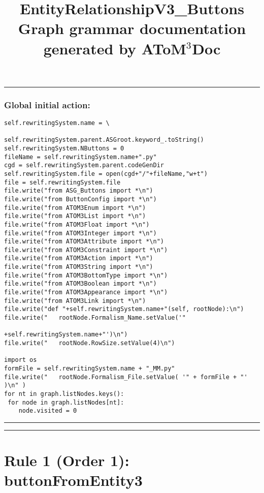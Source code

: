 \documentclass{article}
\title{ \huge{EntityRelationshipV3_Buttons} \\[4mm]
\small{ Graph grammar documentation generated by \textbf{AToM$^{3}$Doc} } }
\begin{document}
   
\maketitle         
\hrule \vspace{6pt}
\subsubsection*{Global initial action: }
\begin{small}\begin{verbatim}
self.rewritingSystem.name = \
                        self.rewritingSystem.parent.ASGroot.keyword_.toString()
self.rewritingSystem.NButtons = 0
fileName = self.rewritingSystem.name+".py"
cgd = self.rewritingSystem.parent.codeGenDir
self.rewritingSystem.file = open(cgd+"/"+fileName,"w+t")
file = self.rewritingSystem.file
file.write("from ASG_Buttons import *\n")
file.write("from ButtonConfig import *\n")
file.write("from ATOM3Enum import *\n")
file.write("from ATOM3List import *\n")
file.write("from ATOM3Float import *\n")
file.write("from ATOM3Integer import *\n")
file.write("from ATOM3Attribute import *\n")
file.write("from ATOM3Constraint import *\n")
file.write("from ATOM3Action import *\n")
file.write("from ATOM3String import *\n")
file.write("from ATOM3BottomType import *\n")
file.write("from ATOM3Boolean import *\n")
file.write("from ATOM3Appearance import *\n")
file.write("from ATOM3Link import *\n")
file.write("def "+self.rewritingSystem.name+"(self, rootNode):\n")
file.write("   rootNode.Formalism_Name.setValue('"
                                            +self.rewritingSystem.name+"')\n")
file.write("   rootNode.RowSize.setValue(4)\n")

import os
formFile = self.rewritingSystem.name + "_MM.py" 
file.write("   rootNode.Formalism_File.setValue( '" + formFile + "' )\n" )
for nt in graph.listNodes.keys():
 for node in graph.listNodes[nt]:
    node.visited = 0
\end{verbatim}\end{small}

\hrule \vspace{6pt}
\hrule \vspace{6pt}
\section*{  Rule 1 (Order 1): buttonFromEntity3}
\end{document}
